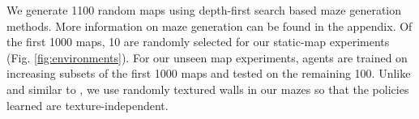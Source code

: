 We generate 1100 random maps using depth-first search based maze generation methods. More information on maze generation can be found in the appendix. 
Of the first 1000 maps, 10 are randomly selected for our static-map experiments (Fig. \ref{fig:environments}). For our unseen map experiments, agents are trained on increasing subsets of the first 1000 maps and tested on the remaining 100.
Unlike \cite{MiPaViICLR2017} and similar to \cite{ChLaSaNIPS2016}, we use randomly textured walls in our mazes so that the policies learned are texture-independent.




%

